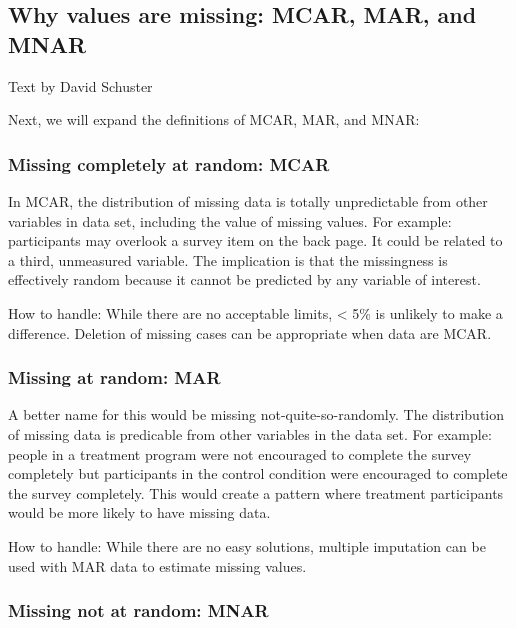 \documentclass[
]{book}
\begin{document}
\hypertarget{why-values-are-missing-mcar-mar-and-mnar}{%
\subsection{Why values are missing: MCAR, MAR, and MNAR}\label{why-values-are-missing-mcar-mar-and-mnar}}

Text by David Schuster

Next, we will expand the definitions of MCAR, MAR, and MNAR:

\hypertarget{missing-completely-at-random-mcar}{%
\subsubsection{Missing completely at random: MCAR}\label{missing-completely-at-random-mcar}}

In MCAR, the distribution of missing data is totally unpredictable from other variables in data set, including the value of missing values. For example: participants may overlook a survey item on the back page. It could be related to a third, unmeasured variable. The implication is that the missingness is effectively random because it cannot be predicted by any variable of interest.

How to handle: While there are no acceptable limits, \textless{} 5\% is unlikely to make a difference. Deletion of missing cases can be appropriate when data are MCAR.

\hypertarget{missing-at-random-mar}{%
\subsubsection{Missing at random: MAR}\label{missing-at-random-mar}}

A better name for this would be missing not-quite-so-randomly. The distribution of missing data is predicable from other variables in the data set. For example: people in a treatment program were not encouraged to complete the survey completely but participants in the control condition were encouraged to complete the survey completely. This would create a pattern where treatment participants would be more likely to have missing data.

How to handle: While there are no easy solutions, multiple imputation can be used with MAR data to estimate missing values.

\hypertarget{missing-not-at-random-mnar}{%
\subsubsection{Missing not at random: MNAR}\label{missing-not-at-random-mnar}}
\end{document}
